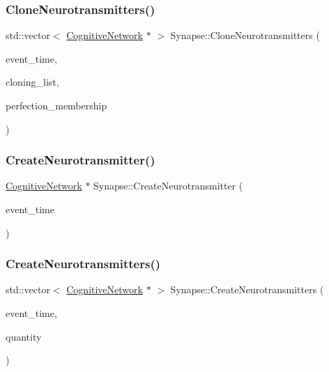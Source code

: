 \subsubsection{\texorpdfstring{Clone\+Neurotransmitters()}{CloneNeurotransmitters()}}
{\footnotesize\ttfamily std\+::vector$<$ \mbox{\hyperlink{classCognitiveNetwork}{Cognitive\+Network}} $\ast$ $>$ Synapse\+::\+Clone\+Neurotransmitters (\begin{DoxyParamCaption}\item[{std\+::chrono\+::time\+\_\+point$<$ \mbox{\hyperlink{universe_8h_a0ef8d951d1ca5ab3cfaf7ab4c7a6fd80}{Clock}} $>$}]{event\+\_\+time,  }\item[{std\+::vector$<$ \mbox{\hyperlink{classCognitiveNetwork}{Cognitive\+Network}} $\ast$$>$}]{cloning\+\_\+list,  }\item[{double}]{perfection\+\_\+membership }\end{DoxyParamCaption})}

\mbox{\label{classSynapse_aef4c17534bc93b31de8e81c1ad138b7b}} 
\subsubsection{\texorpdfstring{Create\+Neurotransmitter()}{CreateNeurotransmitter()}}
{\footnotesize\ttfamily \mbox{\hyperlink{classCognitiveNetwork}{Cognitive\+Network}} $\ast$ Synapse\+::\+Create\+Neurotransmitter (\begin{DoxyParamCaption}\item[{std\+::chrono\+::time\+\_\+point$<$ \mbox{\hyperlink{universe_8h_a0ef8d951d1ca5ab3cfaf7ab4c7a6fd80}{Clock}} $>$}]{event\+\_\+time }\end{DoxyParamCaption})}

\mbox{\label{classSynapse_a593c70925fb80b880c6a01f2f252eb22}} 
\subsubsection{\texorpdfstring{Create\+Neurotransmitters()}{CreateNeurotransmitters()}}
{\footnotesize\ttfamily std\+::vector$<$ \mbox{\hyperlink{classCognitiveNetwork}{Cognitive\+Network}} $\ast$ $>$ Synapse\+::\+Create\+Neurotransmitters (\begin{DoxyParamCaption}\item[{std\+::chrono\+::time\+\_\+point$<$ \mbox{\hyperlink{universe_8h_a0ef8d951d1ca5ab3cfaf7ab4c7a6fd80}{Clock}} $>$}]{event\+\_\+time,  }\item[{int}]{quantity }\end{DoxyParamCaption})}

